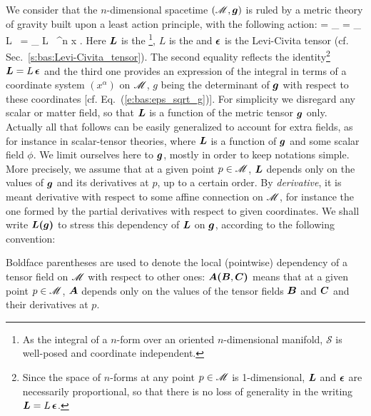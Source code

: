 We consider that the $n$-dimensional spacetime $(\mathscr{M},\bm{g})$ is ruled by a metric theory of gravity built upon
a least action principle, with the following action:
\be \label{e:tha:action_L}
     = \int_{\M}  = \int_{\M} L \, \weps = \int_{\M} L  \, \D^n x .
\ee
Here $\bm{L}$ is the \footnote{As the integral of a $n$-form over an oriented $n$-dimensional manifold, $\mathcal{S}$ is well-posed and coordinate independent.},
$L$ is the 
and
$\bm{\epsilon}$ is the Levi-Civita tensor (cf. Sec.~\ref{s:bas:Levi-Civita_tensor}).
The second equality reflects the identity\footnote{Since the space of $n$-forms at any
point $p\in\mathscr{M}$ is 1-dimensional, $\bm{L}$ and $\bm{\epsilon}$ are
necessarily proportional, so that there is no loss of generality in the writing
$\bm{L} = L \, \bm{\epsilon}$.} $\bm{L} = L \, \bm{\epsilon}$ and the third one provides an expression of the integral
in terms of a coordinate system $(x^\alpha)$ on $\mathscr{M}$, $g$ being the determinant of
$\bm{g}$ with respect to these coordinates [cf. Eq.~(\ref{e:bas:eps_sqrt_g})].
For simplicity we disregard any scalar or matter field, so that
$\bm{L}$ is a function of the metric tensor $\bm{g}$ only.
Actually all that follows can be easily generalized to account for
extra fields, as for instance in scalar-tensor theories, where $\bm{L}$ is a function
of $\bm{g}$ and some scalar field $\phi$. We limit ourselves here to $\bm{g}$,
mostly in order to keep notations simple.
More precisely, we assume that at a given point $p\in\mathscr{M}$, $\bm{L}$ depends only
on the values of $\bm{g}$ and its derivatives at $p$, up to a certain order.
By \emph{derivative}, it is
meant derivative with respect to some affine connection on $\mathscr{M}$, for instance the one
formed by the partial derivatives with respect to given coordinates. We shall
write $\bm{L}\textbf{(}\bm{g}\textbf{)}$ to stress this dependency of $\bm{L}$ on $\bm{g}$, according
to the following convention:
\begin{notation}
\label{n:tha:bold_parentheses}
Boldface parentheses are used to denote the local (pointwise) dependency of a
tensor field on $\mathscr{M}$ with respect to other ones: $\bm{A}\textbf{(} \bm{B}, \bm{C} \textbf{)}$
means that at a given point $p\in\mathscr{M}$, $\bm{A}$ depends only
on the values of the tensor fields $\bm{B}$ and $\bm{C}$ and their derivatives at $p$.
\end{notation}

